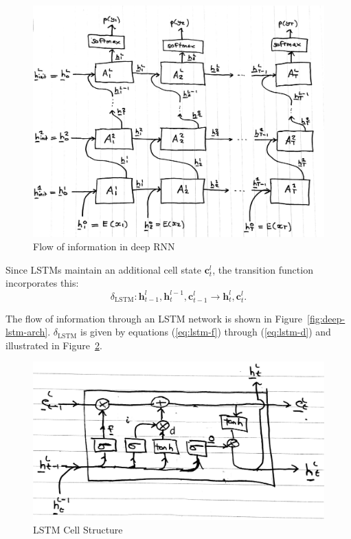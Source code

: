 \documentclass[12pt,a4paper,twoside,openright]{report}
\newcommand{\vect}[1]{\boldsymbol{\mathbf{#1}}}
\begin{document}
\begin{figure}[H]
\centering
\includegraphics[width=400pt]{figs/deep_rnn_tmp.jpg}
\caption{Flow of information in deep RNN}
\label{fig:deep-rnn-arch}
\end{figure}

Since LSTMs maintain an additional cell state $\vect{c}_t^l$, the transition
function incorporates this:
$$ \delta_{\mathrm{LSTM}} : \vect{h}_{t-1}^l, \vect{h}_t^{l-1}, \vect{c}_{t-1}^l
\rightarrow \vect{h}_t^l, \vect{c}_t^l. $$

The flow of information through an LSTM network is shown in
Figure~\ref{fig:deep-lstm-arch}. $\delta_{\mathrm{LSTM}}$ is given by equations
(\ref{eq:lstm-f}) through (\ref{eq:lstm-d}) and illustrated in
Figure~\ref{fig:lstm-cell}.

\begin{figure}[H]
\centering
\includegraphics[width=350pt]{figs/lstm_detail_tmp.png}
\caption{LSTM Cell Structure}
\label{fig:lstm-cell}
\end{figure}
\end{document}
